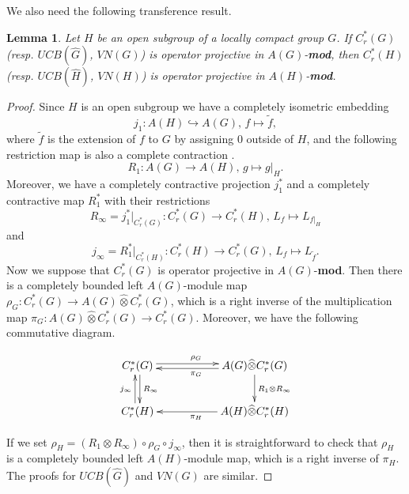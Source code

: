 \documentclass[10pt]{amsart}
\newtheorem{lem}[thm]{Lemma}
\numberwithin{thm}{section}
\numberwithin{equation}{section}
\begin{document}
We also need the following transference result.
	\begin{lem}\label{lem-opensubgp}
	Let $H$ be an open subgroup of a locally compact group $G$.
	If $C^*_r(G)$ (resp. $UCB(\widehat{G})$, $VN(G)$) is operator projective in $A(G)$-{\bf mod},
	then $C^*_r(H)$ (resp. $UCB(\widehat{H})$, $VN(H)$) is operator projective in $A(H)$-{\bf mod}.
	\end{lem}
\begin{proof}
Since $H$ is an open subgroup we have a completely isometric embedding \cite{ForWood}
	$$j_1 : A(H) \hookrightarrow A(G),\, f \mapsto \widetilde{f},$$
where $\widetilde{f}$ is the extension of $f$ to $G$ by assigning 0 outside of $H$,
and the following restriction map is also a complete contraction \cite{ForWood}.
	$$R_1 : A(G) \rightarrow A(H),\, g \mapsto g|_H.$$
Moreover, we have a completely contractive projection $j^*_1$ and a completely contractive map $R^*_1$ with their restrictions
	$$R_\infty = j^*_1|_{C^*_r(G)} : C^*_r(G) \rightarrow C^*_r(H),\, L_f \mapsto L_{f|_H}$$
and
	$$j_\infty = R^*_1|_{C^*_r(H)} : C^*_r(H) \rightarrow C^*_r(G),\, L_f \mapsto L_{\widetilde{f}}.$$
Now we suppose that $C^*_r(G)$ is operator projective in $A(G)$-{\bf mod}.
Then there is a completely bounded left $A(G)$-module map $\rho_G : C^*_r(G) \rightarrow A(G) {\widehat{\otimes}} C^*_r(G)$,
which is a right inverse of the multiplication map $\pi_G : A(G) {\widehat{\otimes}} C^*_r(G) \rightarrow  C^*_r(G)$.
Moreover, we have the following commutative diagram.

	\begin{equation}\label{diagram1}
	\xymatrix{
	C^*_r(G) \ar@<.5ex>[rr]^{\rho_G} \ar@<.5ex>[d]^{R_\infty}
	& & A(G){\widehat{\otimes}} C^*_r(G) \ar[d]^{R_1 \otimes R_\infty} \ar@<.5ex>[ll]^{\pi_G}  \\
	C^*_r(H) \ar@<.5ex>[u]^{j_\infty}
	& & A(H){\widehat{\otimes}} C^*_r(H)
	\ar[ll]^{\pi_H}}
	\end{equation}

If we set $\rho_H = (R_1\otimes R_\infty)\circ \rho_G \circ j_\infty$,
then it is straightforward to check that $\rho_H$ is a completely bounded left $A(H)$-module map, which is a right inverse of $\pi_H$.
The proofs for $UCB(\widehat{G})$ and $VN(G)$ are similar.
\end{proof}
\end{document}
